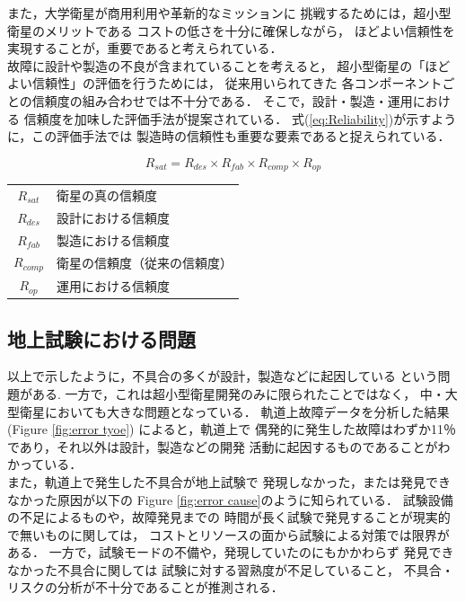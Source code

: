 \documentclass[11pt]{report}
\begin{document}
また，大学衛星が商用利用や革新的なミッションに
挑戦するためには，超小型衛星のメリットである
コストの低さを十分に確保しながら，
ほどよい信頼性を実現することが，重要であると考えられている\cite{SHIRASAKA2011}．\\
故障に設計や製造の不良が含まれていることを考えると，
超小型衛星の「ほどよい信頼性」の評価を行うためには，
従来用いられてきた
各コンポーネントごとの信頼度の組み合わせでは不十分である．
そこで，設計・製造・運用における
信頼度を加味した評価手法が提案されている\cite{SHIRASAKA2011}．
式(\ref{eq:Reliability})が示すように，この評価手法では
製造時の信頼性も重要な要素であると捉えられている．

\begin{equation}
   R_{sat} = R_{des} \times R_{fab} \times R_{comp} \times R_{op} \label{eq:Reliability}
\end{equation}
\begin{table}[H]
   \centering
      \begin{tabular}{cl} 
        $R_{sat}$ & 衛星の真の信頼度\\
        $R_{des}$ & 設計における信頼度\\
        $R_{fab}$ & 製造における信頼度\\
        $R_{comp}$ & 衛星の信頼度（従来の信頼度）\\
        $R_{op}$ & 運用における信頼度
      \end{tabular}
\end{table}

\subsection{地上試験における問題}
以上で示したように，不具合の多くが設計，製造などに起因している
という問題がある.
一方で，これは超小型衛星開発のみに限られたことではなく，
中・大型衛星においても大きな問題となっている．
軌道上故障データを分析した結果\cite{SAITO2011}(Figure \ref{fig:error tyoe})
によると，軌道上で
偶発的に発生した故障はわずか11％であり，それ以外は設計，製造などの開発
活動に起因するものであることがわかっている．\\
また，軌道上で発生した不具合が地上試験で
発現しなかった，または発見できなかった原因が以下の
Figure \ref{fig:error cause}のように知られている．
試験設備の不足によるものや，故障発見までの
時間が長く試験で発見することが現実的で無いものに関しては，
コストとリソースの面から試験による対策では限界がある．
一方で，試験モードの不備や，発現していたのにもかかわらず
発見できなかった不具合に関しては
試験に対する習熟度が不足していること，
不具合・リスクの分析が不十分であることが推測される\cite{SAITO2011}．
\end{document}
